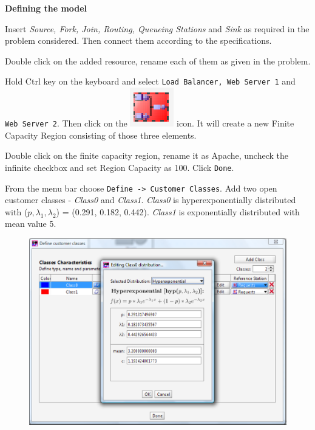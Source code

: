{\large{\textbf{Defining the model}}}
\begin{itemize*}
\item Insert \emph{Source, Fork, Join, Routing, Queueing Stations}
and \emph{Sink} as required in the problem considered. Then
connect them according to the specifications. \item Double click
on the added resource, rename each of them as given in the
problem. \item Hold Ctrl key on the keyboard and select
\texttt{Load Balancer, Web Server 1} and \texttt{Web Server 2}.
Then click on the
\includegraphics[scale=.5]{img/jsimg/addStationToNFCR}
icon. It will create a new Finite Capacity Region consisting of
those three elements. \item Double click on the finite capacity
region, rename it as Apache, uncheck the infinite checkbox and set
Region Capacity as 100. Click \texttt{Done}. \item From the menu
bar choose \texttt{Define -> Customer Classes}. Add two open
customer classes - \emph{Class0} and \emph{Class1}. \emph{Class0}
is hyperexponentially distributed with ($p, \lambda_1, \lambda_2$)
= (0.291, 0.182, 0.442). \emph{Class1} is exponentially
distributed with mean value 5.
\begin{figure}[htb]
    \begin{center}
        \includegraphics[scale=.5]{img/jsimg/12.18.eps}
    \end{center}

\end{figure}
\end{itemize*}
